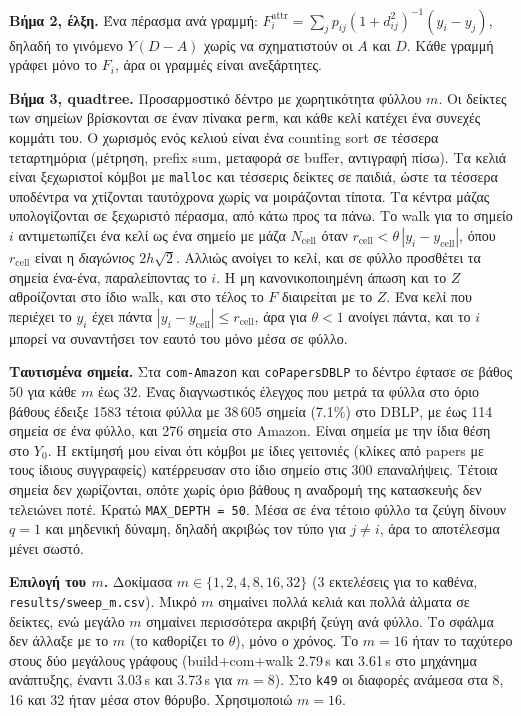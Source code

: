 \documentclass[10pt,a4paper]{article}
\newcommand{\en}[1]{\textlatin{#1}}
\let\origtexttt\texttt
\renewcommand{\texttt}[1]{\textlatin{\origtexttt{#1}}}
\begin{document}
\textbf{Βήμα 2, έλξη.} Ένα πέρασμα ανά γραμμή:
$F^{\mathrm{attr}}_i=\sum_{j}p_{ij}(1+d_{ij}^2)^{-1}(y_i-y_j)$, δηλαδή το γινόμενο $Y(D-A)$ χωρίς
να σχηματιστούν οι $A$ και $D$. Κάθε γραμμή γράφει μόνο το $F_i$, άρα οι γραμμές είναι ανεξάρτητες.

\textbf{Βήμα 3, \en{quadtree}.} Προσαρμοστικό δέντρο με χωρητικότητα φύλλου $m$. Οι δείκτες των
σημείων βρίσκονται σε έναν πίνακα \texttt{perm}, και κάθε κελί κατέχει ένα συνεχές κομμάτι του.
Ο χωρισμός ενός κελιού είναι ένα \en{counting sort} σε τέσσερα τεταρτημόρια (μέτρηση,
\en{prefix sum}, μεταφορά σε \en{buffer}, αντιγραφή πίσω). Τα κελιά είναι ξεχωριστοί κόμβοι με
\texttt{malloc} και τέσσερις δείκτες σε παιδιά, ώστε τα τέσσερα υποδέντρα να χτίζονται ταυτόχρονα
χωρίς να μοιράζονται τίποτα. Τα κέντρα μάζας υπολογίζονται σε ξεχωριστό πέρασμα, από κάτω προς τα
πάνω. Το \en{walk} για το σημείο $i$ αντιμετωπίζει ένα κελί ως ένα σημείο με μάζα $N_{\mathrm{cell}}$
όταν $r_{\mathrm{cell}}<\theta\,|y_i-y_{\mathrm{cell}}|$, όπου $r_{\mathrm{cell}}$ είναι η
\emph{διαγώνιος} $2h\sqrt2$. Αλλιώς ανοίγει το κελί, και σε φύλλο προσθέτει τα σημεία ένα-ένα,
παραλείποντας το $i$. Η μη κανονικοποιημένη άπωση και το $Z$ αθροίζονται στο ίδιο \en{walk}, και στο
τέλος το $F$ διαιρείται με το $Z$. Ένα κελί που περιέχει το $y_i$ έχει πάντα
$|y_i-y_{\mathrm{cell}}|\le r_{\mathrm{cell}}$, άρα για $\theta<1$ ανοίγει πάντα, και το $i$ μπορεί
να συναντήσει τον εαυτό του μόνο μέσα σε φύλλο.

\textbf{Ταυτισμένα σημεία.} Στα \texttt{com-Amazon} και \texttt{coPapersDBLP} το δέντρο έφτασε σε
βάθος 50 για κάθε $m$ έως 32. Ένας διαγνωστικός έλεγχος που μετρά τα φύλλα στο όριο βάθους έδειξε
1583 τέτοια φύλλα με 38\,605 σημεία (7.1\%) στο \en{DBLP}, με έως 114 σημεία σε ένα φύλλο, και 276
σημεία στο \en{Amazon}. Είναι σημεία με την ίδια θέση στο $Y_0$. Η εκτίμησή μου είναι ότι κόμβοι με
ίδιες γειτονιές (κλίκες από \en{papers} με τους ίδιους συγγραφείς) κατέρρευσαν στο ίδιο σημείο στις
300 επαναλήψεις. Τέτοια σημεία δεν χωρίζονται, οπότε χωρίς όριο βάθους η αναδρομή της κατασκευής δεν
τελειώνει ποτέ. Κρατώ \texttt{MAX\_DEPTH = 50}. Μέσα σε ένα τέτοιο φύλλο τα ζεύγη δίνουν $q=1$ και
μηδενική δύναμη, δηλαδή ακριβώς τον τύπο για $j\ne i$, άρα το αποτέλεσμα μένει σωστό.

\textbf{Επιλογή του $m$.} Δοκίμασα $m\in\{1,2,4,8,16,32\}$ (3 εκτελέσεις για το καθένα,
\texttt{results/sweep\_m.csv}). Μικρό $m$ σημαίνει πολλά κελιά και πολλά άλματα σε δείκτες, ενώ μεγάλο
$m$ σημαίνει περισσότερα ακριβή ζεύγη ανά φύλλο. Το σφάλμα δεν άλλαξε με το $m$ (το καθορίζει το
$\theta$), μόνο ο χρόνος. Το $m=16$ ήταν το ταχύτερο στους δύο μεγάλους γράφους (\en{build+com+walk}
2.79\,\en{s} και 3.61\,\en{s} στο μηχάνημα ανάπτυξης, έναντι 3.03\,\en{s} και 3.73\,\en{s} για $m=8$).
Στο \texttt{k49} οι διαφορές ανάμεσα στα 8, 16 και 32 ήταν μέσα στον θόρυβο. Χρησιμοποιώ $m=16$.
\end{document}
